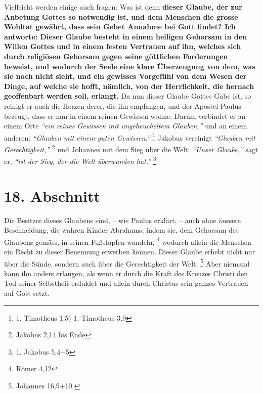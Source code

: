 Vielleicht werden einige auch fragen: Was ist denn \textbf{dieser Glaube, der
zur
Anbetung Gottes so notwendig ist, und dem Menschen die grosse Wohltat gewährt,
dass sein Gebet Annahme bei Gott findet? Ich antworte: Dieser Glaube besteht in
einem heiligen Gehorsam in den Willen Gottes und in einem festen Vertrauen auf
ihn, welches sich durch religiösen Gehorsam gegen
seine göttlichen Forderungen
beweist, und wodurch der Seele eine klare Überzeugung von dem, was sie noch
nicht sieht, und ein gewisses Vorgefühl von dem Wesen der Dinge, auf welche sie
hofft, nämlich, von der Herrlichkeit, die hernach geoffenbart werden soll,
erlangt.} Da nun dieser Glaube Gottes Gabe ist, so reinigt er auch die Herzen
derer, die ihn empfangen, und der Apostel Paulus bezeugt, dass er nun in einem
reinen Gewissen wohne. Darum verbindet er an einem Orte
\textit{"`ein reines Gewissen mit ungeheucheltem Glauben,"'} und an einem
anderen: \textit{"`Glauben mit einem guten
Gewissen."'}
\footnote{1. Timotheus 1,5) 1. Timotheus 3,9}
Jakobus vereinigt
\textit{"`Glauben mit Gerechtigkeit,"'}
\footnote{Jakobus 2,14 bis Ende}
und Johannes mit dem Sieg über
die Welt:\textit{ "`Unser Glaube,"'} sagt er, \textit{"`ist der Sieg, der die
Welt überwunden hat."'} 
\footnote{1. Jakobus 5,4+5}

\section{18. Abschnitt} \label{kap6_ab18}

Die Besitzer dieses Glaubens sind, -- wie Paulus erklärt, -- auch ohne äussere
Beschneidung, die wahren Kinder
Abrahams; indem sie, dem Gehorsam des Glaubens
gemäss, in seinen Fußstapfen wandeln,
\footnote{Römer 4,12}
wodurch allein die
Menschen ein Recht zu dieser Benennung erwerben können. Dieser Glaube erhebt
nicht nur über die Sünde, sondern auch über die
Gerechtigkeit der Welt.
\footnote{Johannes 16,9+10.}
Aber niemand kann ihn anders erlangen, als wenn
er durch die Kraft des Kreuzes Christi den Tod seiner
Selbstheit
erduldet und allein durch Christus sein ganzes Vertrauen auf Gott setzt.

\medskip

